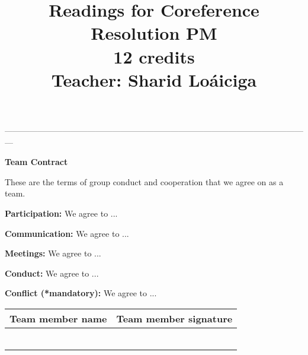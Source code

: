 \documentclass[11pt]{article}
\title{{\LARGE Readings for Coreference Resolution PM}\\[1.5mm]{\large 12
credits}\\[1.5mm]{\large Teacher: Sharid Loáiciga}}
\date{} %
\begin{document}
\begin{center}
---------------------------------------------------------------------------------------------------------------
\vspace{0.5cm}

{\Large \textbf{Team Contract}}
\end{center}

These are the terms of group conduct and cooperation that we agree on as a team. 

\vspace{1cm}

\textbf{Participation:} We agree to ... 
\vspace{2cm}

\textbf{Communication:} We agree to ...
\vspace{2cm}

\textbf{Meetings:} We agree to ...
\vspace{2cm}

\textbf{Conduct:} We agree to ...
\vspace{2cm}

\textbf{Conflict (*mandatory):} We agree to ...
\vspace{2cm}

\centering
\begin{tabular}{|p{7cm}|p{7cm}|}
\hline
\textbf{Team member name} & \textbf{Team member signature} \\
\hline
& \\
& \\
\hline
& \\
& \\
\hline
& \\
& \\
\hline
\end{tabular}
\end{document}
